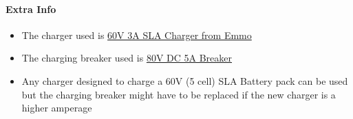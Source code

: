 \paragraph{Extra Info}
\begin{itemize}
  \item The charger used is \href{https://emmo.ca/collections/chargers/products/sla-chargers?variant=42329566019841}{60V 3A SLA Charger from Emmo}
  \item The charging breaker used is \href{https://www.grainger.ca/en/product/CIRCUIT-BREAKER-MAGNETIC-5A-277VAC-80DC/p/WWG10C588}{80V DC 5A Breaker}
  \item Any charger designed to charge a 60V (5 cell) SLA Battery pack can be used but the charging breaker might have to be replaced if the new charger is a higher amperage
\end{itemize}

\pagebreak